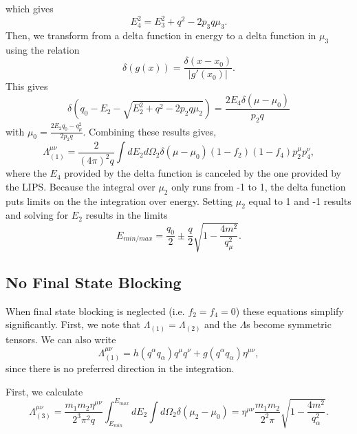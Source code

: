 \documentclass[12pt,letter]{article}
\begin{document}
which gives 
\begin{equation*}
E_4^2 = E_3^2 + q^2 - 2 p_3 q \mu_3.
\end{equation*}
Then, we transform from a delta function in energy to a delta function in $\mu_3$ using the relation
\begin{equation*}
\delta(g(x)) = \frac{\delta(x-x_0)}{|g'(x_0)|}.
\end{equation*} 
This gives 
\begin{equation*}
\delta\left(q_0 - E_2 - \sqrt{E_2^2 + q^2 - 2 p_2 q \mu_2}\right) 
= \frac{2 E_4 \delta(\mu - \mu_0)}{p_2 q}    
\end{equation*}
with $\mu_0 = \frac{2 E_2 q_0 - q_\mu^2}{2 p_2 q}$.  Combining these results gives,
\begin{equation*}
\Lambda_{(1)}^{\mu \nu} = \frac{2}{(4 \pi)^2 q}\int dE_2 d\Omega_2 
\delta(\mu-\mu_0) (1-f_2)(1-f_4)p^\mu_2 p^\nu_4,
\end{equation*}
where the $E_4$ provided by the delta function is canceled by the one provided by the LIPS.  Because the integral over $\mu_2$ only runs from -1 to 1, the delta function puts limits on the the integration over energy.  Setting $\mu_2$ equal to 1 and -1 results and solving for $E_2$ results in the limits 
\begin{equation*}
E_{min/max} = \frac{q_0}{2} \pm \frac{q}{2} \sqrt{1 - \frac{4 m^2}{q_\mu^2}}.
\end{equation*} 

\subsection{No Final State Blocking}
When final state blocking is neglected (i.e. $f_2 = f_4 = 0$) these equations simplify significantly.  First, we note that $\Lambda_{(1)} = \Lambda_{(2)}$ and the $\Lambda$s become symmetric tensors.  We can also write 
\begin{equation*}
\Lambda_{(1)}^{\mu \nu} = 
h(q^\alpha q_\alpha) q^\mu q^\nu + g(q^\alpha q_\alpha) \eta^{\mu \nu},
\end{equation*}
since there is no preferred direction in the integration.  

First, we calculate 
\begin{equation*}
\Lambda_{(3)}^{\mu \nu} = \frac{m_1 m_2 \eta^{\mu \nu}}{2^3 \pi^2 q} 
\int_{E_{min}}^{E_{max}} dE_2  \int d\Omega_2 
\delta(\mu_2 - \mu_0) = \eta^{\mu \nu} \frac{m_1 m_2}{2^2 \pi} 
\sqrt{1 - \frac{4m^2}{q_\alpha^2}}.
\end{equation*}
\end{document}
